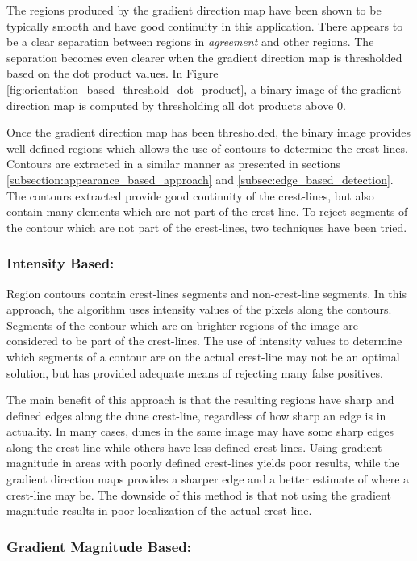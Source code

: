 The regions produced by the gradient direction map have been shown to be typically smooth and have good continuity in this application. There appears to be a clear separation between regions in \emph{agreement} and other regions. The separation becomes even clearer when the gradient direction map is thresholded based on the dot product values. In Figure \ref{fig:orientation_based_threshold_dot_product}, a binary image of the gradient direction map is computed by thresholding all dot products above 0.

Once the gradient direction map has been thresholded, the binary image provides well defined regions which allows the use of contours to determine the crest-lines. Contours are extracted in a similar manner as presented in sections \ref{subsection:appearance_based_approach} and \ref{subsec:edge_based_detection}. The contours extracted provide good continuity of the crest-lines, but also contain many elements which are not part of the crest-line. To reject segments of the contour which are not part of the crest-lines, two techniques have been tried.

\subsubsection*{Intensity Based:}

Region contours contain crest-lines segments and non-crest-line segments. In this approach, the algorithm uses intensity values of the pixels along the contours. Segments of the contour which are on brighter regions of the image are considered to be part of the crest-lines. The use of intensity values to determine which segments of a contour are on the actual crest-line may not be an optimal solution, but has provided adequate means of rejecting many false positives.

The main benefit of this approach is that the resulting regions have sharp and defined edges along the dune crest-line, regardless of how sharp an edge is in actuality. In many cases, dunes in the same image may have some sharp edges along the crest-line while others have less defined crest-lines. Using gradient magnitude in areas with poorly defined crest-lines yields poor results, while the gradient direction maps provides a sharper edge and a better estimate of where a crest-line may be. The downside of this method is that not using the gradient magnitude results in poor localization of the actual crest-line.

\subsubsection*{Gradient Magnitude Based:} \label{subsubsec:gradient_magnitude_based_shift}


